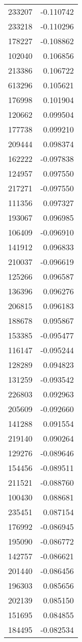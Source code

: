 \begin{tabular}{lr}
233207 & -0.110742 \\
233218 & -0.110296 \\
178227 & -0.108862 \\
102040 & 0.106856 \\
213386 & 0.106722 \\
613296 & 0.105621 \\
176998 & 0.101904 \\
120662 & 0.099504 \\
177738 & 0.099210 \\
209444 & 0.098374 \\
162222 & -0.097838 \\
124957 & 0.097550 \\
217271 & -0.097550 \\
111356 & 0.097327 \\
193067 & 0.096985 \\
106409 & -0.096910 \\
141912 & 0.096833 \\
210037 & -0.096619 \\
125266 & 0.096587 \\
136396 & 0.096276 \\
206815 & 0.096183 \\
188678 & 0.095867 \\
153385 & -0.095477 \\
116147 & -0.095244 \\
128289 & 0.094823 \\
131259 & -0.093542 \\
226803 & 0.092963 \\
205609 & -0.092660 \\
141288 & 0.091554 \\
219140 & 0.090264 \\
129276 & -0.089646 \\
154456 & -0.089511 \\
211521 & -0.088760 \\
100430 & 0.088681 \\
235451 & 0.087154 \\
176992 & -0.086945 \\
195090 & -0.086772 \\
142757 & -0.086621 \\
201440 & -0.086456 \\
196303 & 0.085656 \\
202139 & 0.085150 \\
151695 & 0.084855 \\
184495 & -0.082534 \\

\end{tabular}
